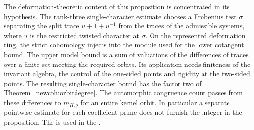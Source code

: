 The deformation-theoretic content of this proposition is concentrated
in its hypothesis. The rank-three single-character estimate chooses
a Frobenius test \(\sigma\) separating the split trace
\(u+1+u^{-1}\) from the traces of the admissible systems, where
\(u\) is the restricted twisted character at \(\sigma\). On the
represented deformation ring, the strict cohomology injects into
the module used for the lower cotangent bound. The upper model bound
is a sum of valuations of the differences of traces over a finite
set meeting the required orbits. Its application needs finiteness of
the invariant algebra, the control of the one-sided points and
rigidity at the two-sided points. The resulting single-character
bound has the factor two of Theorem~\ref{newcoh:orbitdegree}.
The automorphic congruence count passes from these differences to
\(m_{H,p}\) for an entire kernel orbit. In particular a separate
pointwise estimate for each coefficient prime does not furnish the
integer in the proposition. The
is used in the .

